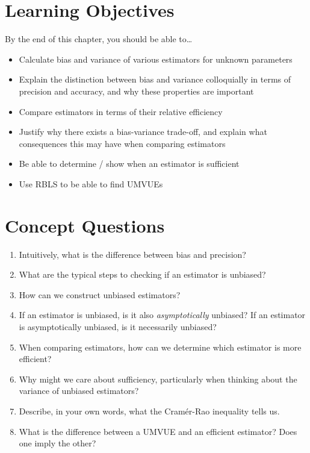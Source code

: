 \documentclass[
  letterpaper,
  DIV=11,
  numbers=noendperiod]{scrreprt}
\begin{document}
\section{Learning Objectives}\label{learning-objectives-3}

By the end of this chapter, you should be able to\ldots{}

\begin{itemize}
\item
  Calculate bias and variance of various estimators for unknown
  parameters
\item
  Explain the distinction between bias and variance colloquially in
  terms of precision and accuracy, and why these properties are
  important
\item
  Compare estimators in terms of their relative efficiency
\item
  Justify why there exists a bias-variance trade-off, and explain what
  consequences this may have when comparing estimators
\item
  Be able to determine / show when an estimator is sufficient
\item
  Use RBLS to be able to find UMVUEs
\end{itemize}

\section{Concept Questions}\label{concept-questions-3}

\begin{enumerate}
\def\labelenumi{\arabic{enumi}.}
\item
  Intuitively, what is the difference between bias and precision?
\item
  What are the typical steps to checking if an estimator is unbiased?
\item
  How can we construct unbiased estimators?
\item
  If an estimator is unbiased, is it also \emph{asymptotically}
  unbiased? If an estimator is asymptotically unbiased, is it
  necessarily unbiased?
\item
  When comparing estimators, how can we determine which estimator is
  more efficient?
\item
  Why might we care about sufficiency, particularly when thinking about
  the variance of unbiased estimators?
\item
  Describe, in your own words, what the Cramér-Rao inequality tells us.
\item
  What is the difference between a UMVUE and an efficient estimator?
  Does one imply the other?
\end{enumerate}
\end{document}
